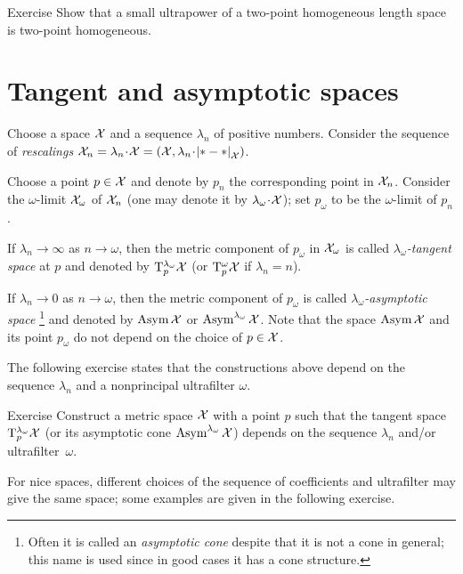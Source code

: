 \begin{thm}{Exercise}\label{ex:two-point-homogeneous}
Show that a small ultrapower of a two-point homogeneous length space is two-point homogeneous.
\end{thm}

\section{Tangent and asymptotic spaces}
\label{sec:tan+asymptotic}

Choose a space $\mathcal{X}$ and a sequence $\lambda_n$ of positive numbers.
Consider the sequence of \emph{rescalings} $\spc{X}_n=\lambda_n\cdot\spc{X}=(\spc{X},\lambda_n\cdot\dist{*}{*}{\spc{X}})$.

Choose a point $p\in \mathcal{X}$ and denote by $p_n$ the corresponding point in $\mathcal{X}_n$.
Consider the $\omega$-limit $\mathcal{X}_\omega$ of $\mathcal{X}_n$ (one may denote it by $\lambda_\omega\cdot \spc{X}$);
set $p_\omega$ to be the $\omega$-limit of $p_n$.

If $\lambda_n\to \infty$ as $n\to\omega$, then the metric component of $p_\omega$ in $\mathcal{X}_\omega$ is called \emph{$\lambda_\omega$-tangent space} at $p$ and denoted by $\mathrm{T}_p^{\lambda_\omega}\mathcal{X}$ (or $\mathrm{T}_p^{\omega}\mathcal{X}$ if $\lambda_n=n$).\label{page:ultratangent space}

If $\lambda_n\to 0$ as $n\to\omega$, then the metric component of $p_\omega$ is called \emph{$\lambda_\omega$-asymptotic space}%
\footnote{Often it is called an \textit{asymptotic cone} despite that it is not a cone in general; this name is used since in good cases it has a cone structure.} and denoted by $\mathop{\rm Asym}\nolimits\mathcal{X}$ or $\mathop{\rm Asym}\nolimits^{\lambda_\omega}\mathcal{X}$.
Note that the space $\mathop{\rm Asym}\nolimits\mathcal{X}$ and its point $p_\omega$ do not depend on the choice of $p\in \mathcal{X}$.

The following exercise states that the constructions above depend on the sequence $\lambda_n$ and a nonprincipal ultrafilter $\omega$.

\begin{thm}{Exercise}\label{ex:ultraT}
Construct a metric space $\mathcal{X}$ with a point $p$ such that the tangent space
$\mathrm{T}_p^{\lambda_\omega}\mathcal{X}$ (or its asymptotic cone $\mathop{\rm Asym}\nolimits^{\lambda_\omega}\mathcal{X}$) depends on the sequence $\lambda_n$ and/or ultrafilter~$\omega$.
\end{thm}

For nice spaces, different choices of the sequence of coefficients and ultrafilter may give the same space; 
some examples are given in the following exercise.

